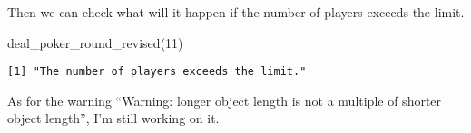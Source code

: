 \documentclass[
  letterpaper,
  DIV=11,
  numbers=noendperiod]{scrartcl}
\newenvironment{Shaded}{\begin{snugshade}}{\end{snugshade}}
\newcommand{\DecValTok}[1]{\textcolor[rgb]{0.68,0.00,0.00}{#1}}
\newcommand{\FunctionTok}[1]{\textcolor[rgb]{0.28,0.35,0.67}{#1}}
\newcommand{\NormalTok}[1]{\textcolor[rgb]{0.00,0.23,0.31}{#1}}
\begin{document}
Then we can check what will it happen if the number of players exceeds
the limit.

\begin{Shaded}
\begin{Highlighting}[]
\FunctionTok{deal\_poker\_round\_revised}\NormalTok{(}\DecValTok{11}\NormalTok{)}
\end{Highlighting}
\end{Shaded}

\begin{verbatim}
[1] "The number of players exceeds the limit."
\end{verbatim}

As for the warning ``Warning: longer object length is not a multiple of
shorter object length'', I'm still working on it.
\end{document}
